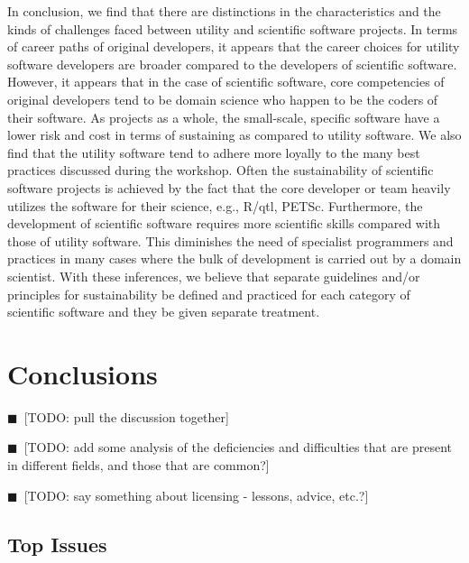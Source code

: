 \documentclass[11pt, oneside]{amsart}
\newcommand{\todo}[1]{{\color{blue}$\blacksquare$~\textsf{[TODO: #1]}}}
\newcommand{\note}[1]{ {\textcolor{red}    { #1 }}}
\newcommand{\toolname}[1] {\textsf{#1}}
\begin{document}
In conclusion, we find that there are distinctions in the characteristics and
the kinds of challenges faced between utility and scientific software projects.
In terms of career paths of original developers, it appears that the career
choices for utility software developers are broader compared to the developers
of scientific software. However, it appears that in the case of scientific
software, core competencies of original developers tend to be domain science
who happen to be the coders of their software. As projects as a whole, the
small-scale, specific software have a lower risk and cost in terms of
sustaining as compared to utility software. We also find that the utility
software tend to adhere more loyally to the many best practices discussed
during the workshop. Often the sustainability of scientific software projects
is achieved by the fact that the core developer or team heavily utilizes the
software for their science, e.g.,  \toolname{R/qtl, PETSc}.  Furthermore, the
development of scientific software requires more scientific skills compared
with those of utility software. This diminishes the need of specialist
programmers and practices in many cases where the bulk of development is
carried out by a domain scientist. With these inferences, we believe that
separate guidelines and/or principles for sustainability be defined and
practiced for each category of scientific software and they be given separate
treatment.


\section{Conclusions} \label{sec:conclusions}

\todo{pull the discussion together}

\todo{add some analysis of the deficiencies and difficulties that are
  present in different fields, and those that are common?}

\todo{say something about licensing - lessons, advice, etc.?}

\subsection{Top Issues}
\end{document}

